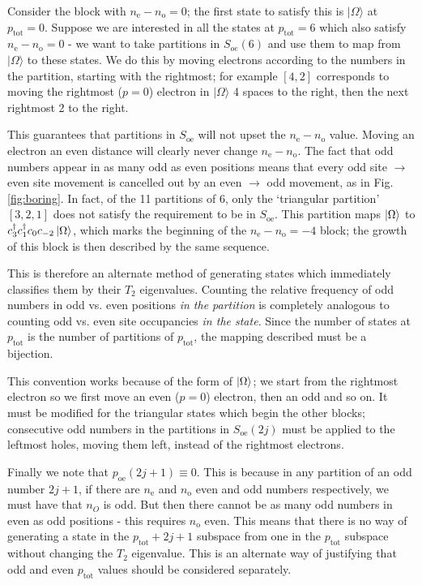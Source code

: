 \documentclass[aps,prx,10pt,twocolumn,amsmath,amssymb,superscriptaddress]{revtex4-2}
\newcommand{\ptot}{p_{\mathrm{tot}}}
\newcommand{\groundstate}{|\Omega\rangle}
\theoremstyle{definition}
\theoremstyle{definition}
\begin{document}
Consider the block with $n_{\text{e}}-n_{\text{o}} = 0$; the first state to satisfy this is $\groundstate$ at $\ptot = 0$. Suppose we are interested in all the states at $\ptot = 6$ which also satisfy $n_{\text{e}}-n_{\text{o}} = 0$ - we want to take partitions in $S_{\textit{oe}}(6)$ and use them to map from $\groundstate$ to these states. We do this by moving electrons according to the numbers in the partition, starting with the rightmost; for example $[4,2]$ corresponds to
moving the rightmost ($p=0$) electron in $\groundstate$ 4 spaces to the right, then the next rightmost 2 to the right. 

This guarantees that partitions in $S_{\text{oe}}$ will not upset the $n_{\text{e}}-n_{\text{o}}$ value. Moving an electron an even distance will clearly never change $n_{\text{e}}-n_{\text{o}}$. The fact that odd numbers appear in as many odd as even positions means that every odd site $\rightarrow$ even site movement is cancelled out by an even $\rightarrow$ odd movement, as in Fig. \ref{fig:boring}. In fact, of the 11 partitions of 6, only the `triangular partition' $[3,2,1]$ does not satisfy the requirement to be in $S_{\text{oe}}$. This partition maps $\ket{\Omega}$ to $c_3^{\dagger}c_1^{\dagger}c_0c_{-2}\ket{\Omega}$, which marks the beginning of the 
$n_{\text{e}}-n_{\text{o}} = -4$ block; the growth of this block is then described by the same sequence. 

This is therefore an alternate method of generating states which immediately classifies them by their $T_2$ eigenvalues. Counting the relative frequency of odd numbers in odd vs. even positions \textit{in the partition} is completely analogous to counting odd vs. even site occupancies \textit{in the state}. Since the number of states at $\ptot$ is the number of partitions of $\ptot$, the mapping described must be a bijection.
 
This convention works because of the form of $\ket{\Omega}$; we start from the rightmost electron so we first move an even ($p=0$) electron, then an odd and so on. It must be modified for the triangular states which begin the other blocks; consecutive odd numbers in the partitions in $S_{\text{oe}}(2j)$ must be applied to the leftmost holes, moving them left, instead of the rightmost electrons. 

Finally we note that $p_{\text{oe}}(2j+1) \equiv 0$. This is because in any partition of an odd number $2j+1$, if there are $n_{\text{e}}$ and $n_{\text{o}}$ even and odd numbers respectively, we must have that $n_O$ is odd. But then there cannot be as many odd numbers in even as odd positions - this requires $n_{\text{o}}$ even. This means that there is no way of generating a state in the $\ptot+2j+1$ subspace from one in the $\ptot$ subspace without changing the $T_2$ eigenvalue. This is an alternate way of justifying that odd and even $\ptot$ values should be considered separately.
\end{document}
